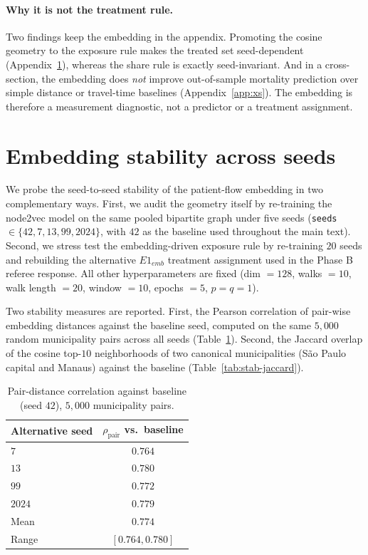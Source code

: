 \paragraph{Why it is not the treatment rule.} Two findings keep the
embedding in the appendix. Promoting the cosine geometry to the exposure
rule makes the treated set seed-dependent (Appendix~\ref{app:stability}),
whereas the share rule is exactly seed-invariant. And in a cross-section,
the embedding does \emph{not} improve out-of-sample mortality prediction
over simple distance or travel-time baselines (Appendix~\ref{app:xs}).
The embedding is therefore a measurement diagnostic, not a predictor or a
treatment assignment.

\section{Embedding stability across seeds}
\label{app:stability}

We probe the seed-to-seed stability of the patient-flow embedding in
two complementary ways. First, we audit the geometry itself by
re-training the node2vec model on the same pooled bipartite graph
under five seeds (\texttt{seeds} $\in \{42, 7, 13, 99, 2024\}$, with
$42$ as the baseline used throughout the main text). Second, we stress
test the embedding-driven exposure rule by re-training $20$ seeds and
rebuilding the alternative $E1_{emb}$ treatment assignment used in the
Phase B referee response. All other hyperparameters are fixed (dim
$= 128$, walks $= 10$, walk length $= 20$, window $= 10$, epochs $= 5$,
$p = q = 1$).

Two stability measures are reported. First, the Pearson correlation of
pair-wise embedding distances against the baseline seed,
computed on the same $5{,}000$ random municipality pairs across all
seeds (Table~\ref{tab:stab-pairs}). Second, the Jaccard overlap of
the cosine top-$10$ neighborhoods of two canonical municipalities
(São Paulo capital and Manaus) against the baseline
(Table~\ref{tab:stab-jaccard}).

\begin{table}[h!]
\centering
\caption{Pair-distance correlation against baseline (seed $42$),
$5{,}000$ municipality pairs.}
\label{tab:stab-pairs}
\small
\begin{tabular}{lc}
\toprule
Alternative seed & $\rho_{\text{pair}}$ vs.\ baseline \\
\midrule
$7$    & $0.764$ \\
$13$   & $0.780$ \\
$99$   & $0.772$ \\
$2024$ & $0.779$ \\
\midrule
Mean   & $0.774$ \\
Range  & $[0.764, 0.780]$ \\
\bottomrule
\end{tabular}
\end{table}

